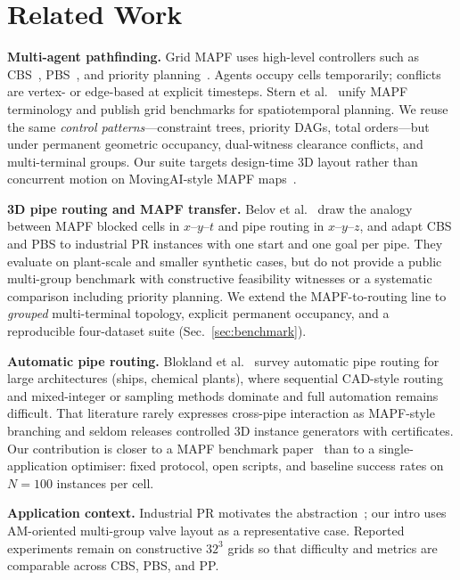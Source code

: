 
\section{Related Work}
\label{sec:related}

\textbf{Multi-agent pathfinding.}
Grid MAPF uses high-level controllers such as CBS~\cite{sharon2012cbs},
PBS~\cite{ma2019pbs}, and priority planning~\cite{felner2017socs}.
Agents occupy cells temporarily; conflicts are vertex- or edge-based at explicit
timesteps.
Stern et al.~\cite{stern2019mapf} unify MAPF terminology and publish grid
benchmarks for spatiotemporal planning.
We reuse the same \emph{control patterns}---constraint trees, priority DAGs,
total orders---but under permanent geometric occupancy, dual-witness clearance
conflicts, and multi-terminal groups.
Our suite targets design-time 3D layout rather than concurrent motion on
MovingAI-style MAPF maps~\cite{stern2019mapf}.

\textbf{3D pipe routing and MAPF transfer.}
Belov et al.~\cite{belov2020pr} draw the analogy between MAPF blocked cells in
$x$--$y$--$t$ and pipe routing in $x$--$y$--$z$, and adapt CBS and PBS to
industrial PR instances with one start and one goal per pipe.
They evaluate on plant-scale and smaller synthetic cases, but do not provide a
public multi-group benchmark with constructive feasibility witnesses or a
systematic comparison including priority planning.
We extend the MAPF-to-routing line to \emph{grouped} multi-terminal topology,
explicit permanent occupancy, and a reproducible four-dataset suite
(Sec.~\ref{sec:benchmark}).

\textbf{Automatic pipe routing.}
Blokland et al.~\cite{blokland2023pipe} survey automatic pipe routing for
large architectures (ships, chemical plants), where sequential CAD-style routing
and mixed-integer or sampling methods dominate and full automation remains
difficult.
That literature rarely expresses cross-pipe interaction as MAPF-style branching
and seldom releases controlled 3D instance generators with certificates.
Our contribution is closer to a MAPF benchmark paper~\cite{stern2019mapf} than
to a single-application optimiser: fixed protocol, open scripts, and baseline
success rates on $N{=}100$ instances per cell.

\textbf{Application context.}
Industrial PR motivates the abstraction~\cite{belov2020pr,blokland2023pipe};
our intro uses AM-oriented multi-group valve layout as a representative case.
Reported experiments remain on constructive $32^3$ grids so that difficulty and
metrics are comparable across CBS, PBS, and PP.
